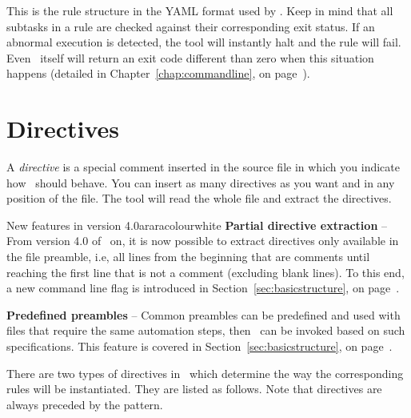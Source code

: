 This is the rule structure in the \gls{YAML} format used by \arara. Keep in mind that all subtasks in a rule are checked against their corresponding exit status. If an abnormal execution is detected, the tool will instantly halt and the rule will fail. Even \arara\ itself will return an exit code different than zero when this situation happens (detailed in Chapter~\ref{chap:commandline}, on page~\pageref{chap:commandline}).

\section{Directives}
\label{sec:directives}

A \emph{directive} is a special comment inserted in the source file in which you indicate how \arara\ should behave. You can insert as many directives as you want and in any position of the file. The tool will read the whole file and extract the directives.

\begin{messagebox}{New features in version 4.0}{araracolour}{\icinfo}{white}
\setlength{\parskip}{1em}
\textbf{Partial directive extraction} -- From version 4.0 of \arara\ on, it is now possible to extract directives only available in the file preamble, i.e, all lines from the beginning that are comments until reaching the first line that is not a comment (excluding blank lines). To this end, a new command line flag is introduced in Section~\ref{sec:basicstructure}, on page~\pageref{sec:basicstructure}.

\textbf{Predefined preambles} -- Common preambles can be predefined and used with files that require the same automation steps, then \arara\ can be invoked based on such specifications. This feature is covered in Section~\ref{sec:basicstructure}, on page~\pageref{sec:basicstructure}.
\end{messagebox}


There are two types of directives in \arara\ which determine the way the corresponding rules will be instantiated. They are listed as follows. Note that directives are always preceded by the  pattern.

